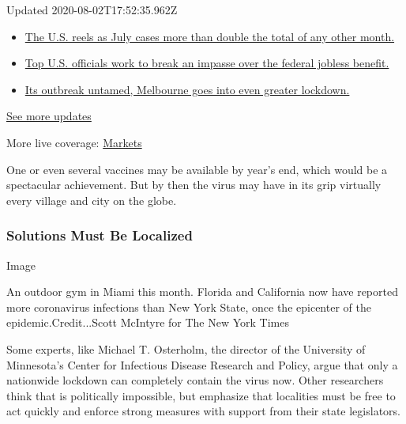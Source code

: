 Updated 2020-08-02T17:52:35.962Z

\begin{itemize}
\tightlist
\item
  \href{https://www.nytimes3xbfgragh.onion/2020/08/01/world/coronavirus-covid-19.html?action=click\&pgtype=Article\&state=default\&region=MAIN_CONTENT_1\&context=storylines_live_updates\#link-34047410}{The
  U.S. reels as July cases more than double the total of any other
  month.}
\item
  \href{https://www.nytimes3xbfgragh.onion/2020/08/01/world/coronavirus-covid-19.html?action=click\&pgtype=Article\&state=default\&region=MAIN_CONTENT_1\&context=storylines_live_updates\#link-780ec966}{Top
  U.S. officials work to break an impasse over the federal jobless
  benefit.}
\item
  \href{https://www.nytimes3xbfgragh.onion/2020/08/01/world/coronavirus-covid-19.html?action=click\&pgtype=Article\&state=default\&region=MAIN_CONTENT_1\&context=storylines_live_updates\#link-2bc8948}{Its
  outbreak untamed, Melbourne goes into even greater lockdown.}
\end{itemize}

\href{https://www.nytimes3xbfgragh.onion/2020/08/01/world/coronavirus-covid-19.html?action=click\&pgtype=Article\&state=default\&region=MAIN_CONTENT_1\&context=storylines_live_updates}{See
more updates}

More live coverage:
\href{https://www.nytimes3xbfgragh.onion/live/2020/07/31/business/stock-market-today-coronavirus?action=click\&pgtype=Article\&state=default\&region=MAIN_CONTENT_1\&context=storylines_live_updates}{Markets}

One or even several vaccines may be available by year's end, which would
be a spectacular achievement. But by then the virus may have in its grip
virtually every village and city on the globe.

\hypertarget{solutions-must-be-localized}{%
\subsubsection{Solutions Must Be
Localized}\label{solutions-must-be-localized}}

Image

An outdoor gym in Miami this month. Florida and California now have
reported more coronavirus infections than New York State, once the
epicenter of the epidemic.Credit...Scott McIntyre for The New York Times

Some experts, like Michael T. Osterholm, the director of the University
of Minnesota's Center for Infectious Disease Research and Policy, argue
that only a nationwide lockdown can completely contain the virus now.
Other researchers think that is politically impossible, but emphasize
that localities must be free to act quickly and enforce strong measures
with support from their state legislators.

